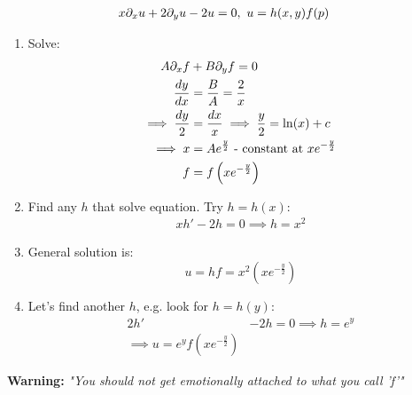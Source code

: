 \documentclass[Maths.tex]{subfiles}
\begin{document}
\begin{example}
\begin{align*}
	x\partial_xu &+ 2\partial_yu - 2u = 0,~ u = h(x,y)f(p)
\end{align*}
\begin{enumerate}
	\item Solve:
	\begin{align*}
		A\partial_xf &+ B\partial_yf = 0 \\
		\frac{dy}{dx} &= \frac{B}{A} = \frac{2}{x} \\
		\implies \frac{dy}{2} &= \frac{dx}{x} \implies \frac{y}{2} = \ln(x) + c \\
		\implies x &= Ae^{\frac{y}{2}} \text{ - constant at } xe^{-\frac{y}{2}} \\
		f &= f\left(xe^{-\frac{y}{2}}\right)
	\end{align*}
	\item Find any $h$ that solve equation. Try $h = h(x)$:
	\begin{align*}
		xh' - 2h = 0 \implies h = x^2
	\end{align*}
	\item General solution is:
	\begin{equation*}
		u = hf = x^2\left(xe^{-\frac{y}{2}}\right	)
	\end{equation*}
	\setcounter{enumi}{1}
	\item Let's find another $h$, e.g. look for $h = h(y)$:
	\begin{align*}
		2h' &- 2h = 0 \implies h = e^y \\
		\implies u = e^yf\left(xe^{-\frac{y}{2}}\right)
	\end{align*}
\end{enumerate}
\textbf{Warning:} \textit{"You should not get emotionally attached to what you call 'f'"}
\end{example}
\end{document}
